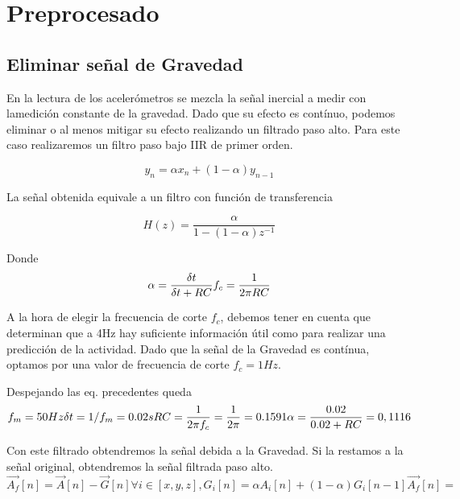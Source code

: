 \documentclass[../tfm.tex]{subfiles}
\begin{document}


\section{Preprocesado}

\subsection{Eliminar señal de Gravedad}

En la lectura de los acelerómetros se mezcla la señal inercial a medir con lamedición constante de la gravedad. Dado que su efecto es contínuo, podemos eliminar o al menos mitigar su efecto realizando un filtrado paso alto. Para este caso realizaremos un filtro paso bajo IIR de primer orden.

\[
  y_n = \alpha x_n + (1-\alpha) y_{n-1}
\]

La señal obtenida equivale a un filtro con función de transferencia

\[
  H(z) = \frac{\alpha}{1-(1-\alpha)z^{-1}}
\]

Donde
\[
\alpha = \frac{\delta t}{\delta t + RC} \\
f_c= \frac{1}{2 \pi RC}
\]

A la hora de elegir la frecuencia de corte $f_c$, debemos tener en cuenta que determinan que a 4Hz hay suficiente información útil como para realizar una predicción de la actividad. Dado que la señal de la Gravedad es contínua, optamos por una valor de frecuencia de corte $f_c=1Hz$.

Despejando las eq. precedentes queda
\[
f_m = 50Hz\\
\delta t= 1/f_m = 0.02s\\
RC=\frac{1}{2\pi f_c} = \frac{1}{2\pi} = 0.1591\\
\alpha = \frac{0.02}{0.02 + RC} = 0,1116
\]

Con este filtrado obtendremos la señal debida a la Gravedad. Si la restamos a la señal original, obtendremos la señal filtrada paso alto.
\[
  \vec{A_f}[n] = \vec{A}[n] - \vec{G}[n]
  \forall i \in [x,y,z], G_i[n] = \alpha A_i[n] + (1-\alpha)G_i[n-1]
  \vec{A_f}[n] =
\]



\end{document}
